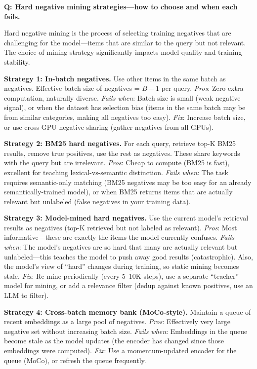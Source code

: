 
\begin{interviewq}
\textbf{Q: Hard negative mining strategies---how to choose and when each fails.}

 \quad {} \quad \badgefreq{\freqmed}

\stronganswer

Hard negative mining is the process of selecting training negatives that are challenging for the model---items that are similar to the query but not relevant. The choice of mining strategy significantly impacts model quality and training stability.

\textbf{Strategy 1: In-batch negatives.} Use other items in the same batch as negatives. Effective batch size of negatives = $B - 1$ per query. \textit{Pros}: Zero extra computation, naturally diverse. \textit{Fails when}: Batch size is small (weak negative signal), or when the dataset has selection bias (items in the same batch may be from similar categories, making all negatives too easy). \textit{Fix}: Increase batch size, or use cross-GPU negative sharing (gather negatives from all GPUs).

\textbf{Strategy 2: BM25 hard negatives.} For each query, retrieve top-K BM25 results, remove true positives, use the rest as negatives. These share keywords with the query but are irrelevant. \textit{Pros}: Cheap to compute (BM25 is fast), excellent for teaching lexical-vs-semantic distinction. \textit{Fails when}: The task requires semantic-only matching (BM25 negatives may be too easy for an already semantically-trained model), or when BM25 returns items that are actually relevant but unlabeled (false negatives in your training data).

\textbf{Strategy 3: Model-mined hard negatives.} Use the current model's retrieval results as negatives (top-K retrieved but not labeled as relevant). \textit{Pros}: Most informative---these are exactly the items the model currently confuses. \textit{Fails when}: The model's negatives are so hard that many are actually relevant but unlabeled---this teaches the model to push away good results (catastrophic). Also, the model's view of ``hard'' changes during training, so static mining becomes stale. \textit{Fix}: Re-mine periodically (every 5--10K steps), use a separate ``teacher'' model for mining, or add a relevance filter (dedup against known positives, use an LLM to filter).

\textbf{Strategy 4: Cross-batch memory bank (MoCo-style).} Maintain a queue of recent embeddings as a large pool of negatives. \textit{Pros}: Effectively very large negative set without increasing batch size. \textit{Fails when}: Embeddings in the queue become stale as the model updates (the encoder has changed since those embeddings were computed). \textit{Fix}: Use a momentum-updated encoder for the queue (MoCo), or refresh the queue frequently.


\end{interviewq}
